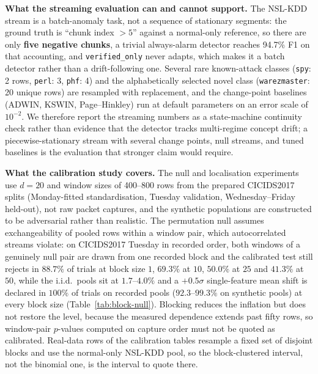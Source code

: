 \documentclass[10pt,conference]{IEEEtran}
\begin{document}
\textbf{What the streaming evaluation can and cannot support.}
The NSL-KDD stream is a batch-anomaly task, not a sequence of stationary
segments: the ground truth is ``chunk index $> 5$'' against a normal-only
reference, so there are only \textbf{five negative chunks}, a trivial
always-alarm detector reaches 94.7\% F1 on that accounting, and
\texttt{verified\_only} never adapts, which makes it a batch detector rather than
a drift-following one. Several rare known-attack classes (\texttt{spy}: 2 rows,
\texttt{perl}: 3, \texttt{phf}: 4) and the alphabetically selected novel class
(\texttt{warezmaster}: 20 unique rows) are resampled with replacement, and the
change-point baselines (ADWIN, KSWIN, Page--Hinkley) run at default parameters
on an error scale of $10^{-2}$. We therefore report the streaming numbers as a
state-machine continuity check rather than evidence that the detector tracks
multi-regime concept drift; a piecewise-stationary stream with several change
points, null streams, and tuned baselines is the evaluation that stronger claim
would require.

\textbf{What the calibration study covers.}
The null and localisation experiments use $d = 20$ and window sizes of 400--800
rows from the prepared CICIDS2017 splits (Monday-fitted standardisation,
Tuesday validation, Wednesday--Friday held-out), not raw packet captures, and the
synthetic populations are constructed to be adversarial rather than realistic.
The permutation null assumes exchangeability of pooled rows within a window
pair, which autocorrelated streams violate: on CICIDS2017 Tuesday in recorded
order, both windows of a genuinely null pair are drawn from one recorded block
and the calibrated test still rejects in $88.7\%$ of trials at block size $1$,
$69.3\%$ at $10$, $50.0\%$ at $25$ and $41.3\%$ at $50$, while the i.i.d.\ pools
sit at $1.7$--$4.0\%$ and a $+0.5\sigma$ single-feature mean shift is declared in
$100\%$ of trials on recorded pools ($92.3$--$99.3\%$ on synthetic pools) at every
block size (Table~\ref{tab:block-null}). Blocking reduces the inflation but does
not restore the level, because the measured dependence extends past fifty rows, so
window-pair $p$-values computed on capture order must not be quoted as calibrated.
Real-data rows of the calibration tables resample a fixed set of disjoint blocks
and use the normal-only NSL-KDD pool, so the block-clustered interval, not the
binomial one, is the interval to quote there.

\end{document}
